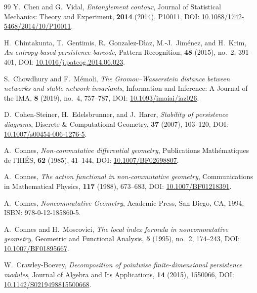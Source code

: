 \documentclass[11pt,a4paper,reqno]{amsart}
\theoremstyle{definition}
\numberwithin{equation}{section}
\begin{document}
\begin{thebibliography}{99}
Y.~Chen and G.~Vidal,
\emph{Entanglement contour},
Journal of Statistical Mechanics: Theory and Experiment, \textbf{2014} (2014), P10011, DOI: \href{https://doi.org/10.1088/1742-5468/2014/10/P10011}{10.1088/1742-5468/2014/10/P10011}.

H.~Chintakunta, T.~Gentimis, R.~Gonzalez-D{\'\i}az, M.-J.~Jim{\'e}nez, and H.~Krim,
\emph{An entropy-based persistence barcode},
Pattern Recognition, \textbf{48} (2015), no.~2, 391--401, DOI: \href{https://doi.org/10.1016/j.patcog.2014.06.023}{10.1016/j.patcog.2014.06.023}.

S.~Chowdhury and F.~M{\'e}moli,
\emph{The Gromov--Wasserstein distance between networks and stable network invariants},
Information and Inference: A Journal of the IMA, \textbf{8} (2019), no.~4, 757--787, DOI: \href{https://doi.org/10.1093/imaiai/iaz026}{10.1093/imaiai/iaz026}.

D.~Cohen-Steiner, H.~Edelsbrunner, and J.~Harer,
\emph{Stability of persistence diagrams},
Discrete \& Computational Geometry, \textbf{37} (2007), 103--120, DOI: \href{https://doi.org/10.1007/s00454-006-1276-5}{10.1007/s00454-006-1276-5}.

A.~Connes,
\emph{Non-commutative differential geometry},
Publications Math{\'e}matiques de l'IH{\'E}S, \textbf{62} (1985), 41--144, DOI: \href{https://doi.org/10.1007/BF02698807}{10.1007/BF02698807}.

A.~Connes,
\emph{The action functional in non-commutative geometry},
Communications in Mathematical Physics, \textbf{117} (1988), 673--683, DOI: \href{https://doi.org/10.1007/BF01218391}{10.1007/BF01218391}.

A.~Connes,
\emph{Noncommutative Geometry},
Academic Press, San Diego, CA, 1994, ISBN: 978-0-12-185860-5.

A.~Connes and H.~Moscovici,
\emph{The local index formula in noncommutative geometry},
Geometric and Functional Analysis, \textbf{5} (1995), no.~2, 174--243, DOI: \href{https://doi.org/10.1007/BF01895667}{10.1007/BF01895667}.

W.~Crawley-Boevey,
\emph{Decomposition of pointwise finite-dimensional persistence modules},
Journal of Algebra and Its Applications, \textbf{14} (2015), 1550066, DOI: \href{https://doi.org/10.1142/S0219498815500668}{10.1142/S0219498815500668}.


\end{thebibliography}
\end{document}
